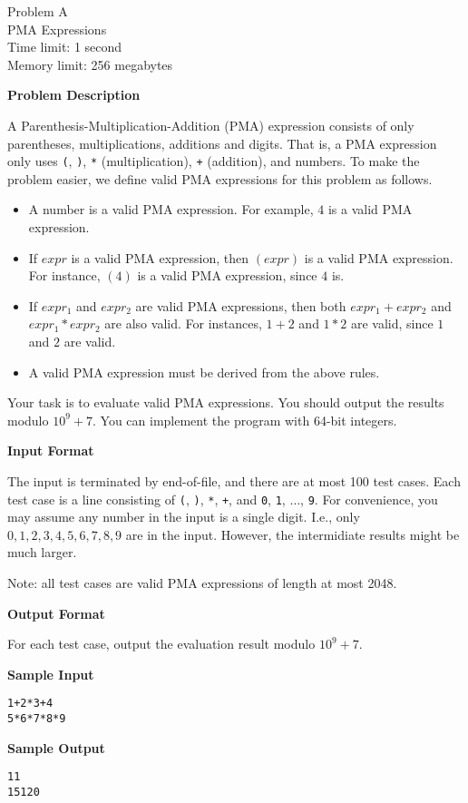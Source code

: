 \documentclass[11pt]{article}
\begin{document}
\begin{center}
    {\LARGE Problem A}\\
    {\Large PMA Expressions}\\
    {Time limit: 1 second}\\
    {Memory limit: 256 megabytes}
\end{center}

\textbf{\large Problem Description}

A Parenthesis-Multiplication-Addition (PMA) expression 
consists of only parentheses, multiplications, additions and digits. That is,
a PMA expression only uses \verb+(+, \verb+)+, \verb+*+ (multiplication), 
\texttt{+} (addition), and numbers.
To make the problem easier, we define valid PMA expressions for this problem 
as follows.
\begin{itemize}
\item A number is a valid PMA expression. For example, $4$ is a valid PMA 
expression.
\item If $expr$ is a valid PMA expression, then $(expr)$ is a valid PMA 
expression. For instance, $(4)$ is a valid PMA expression, since $4$ is. 
\item If $expr_1$ and $expr_2$ are valid PMA expressions, then both 
$expr_1+expr_2$ and $expr_1*expr_2$ are also valid. For instances, $1+2$ and 
$1*2$ are valid, since $1$ and $2$ are valid.
\item A valid PMA expression must be derived from the above rules.
\end{itemize}

Your task is to evaluate valid PMA expressions. You should output the results 
modulo $10^9+7$. You can implement the program with 64-bit integers.

\textbf{\large Input Format}

The input is terminated by end-of-file, and there are at most 100 test cases.
Each test case is a line consisting of \verb+(+, \verb+)+, \verb+*+,
\texttt{+}, and \verb+0+, \verb+1+, $\dots$, \verb+9+. For convenience, you
may assume any number in the input is a single digit. I.e., only 
$0,1,2,3,4,5,6,7,8,9$ are in the input. However, the intermidiate results might
be much larger. 

Note: all test cases are valid PMA expressions of length at most 2048.

\textbf{\large Output Format}

For each test case, output the evaluation result modulo $10^9+7$.

\textbf{\large Sample Input}

\begin{verbatim}
1+2*3+4
5*6*7*8*9
\end{verbatim}

\textbf{\large Sample Output}
\begin{verbatim}
11
15120
\end{verbatim}
\end{document}
